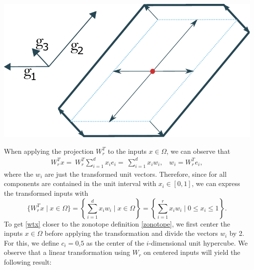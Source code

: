 \documentclass[
  a4paper,  %
  twoside,  %
  bibliography=totoc,
  headsepline,
  cleardoublepage=empty,
  parskip=half,
  draft=false
]{scrbook}
\begin{document}
\begin{mdframed}[style=style]
        \centering
\begin{minipage}{.4\textwidth}
        \centering
  \label{fig:zonotope}
    \end{minipage}%
    \begin{minipage}{0.6\textwidth}
        \centering
        \vspace{3.5mm}
  \includegraphics[width=0.8\linewidth]{graphics/zonotope}
  \hspace{-5.5mm}
    \end{minipage}
\end{mdframed}
%
When applying the projection $W_r^T$ to the inputs $x \in \Omega$, we can observe that
\begin{equation}
\begin{split}
W_r^T x=~W_r^T \sum_{i=1}^d x_i e_i=~\sum_{i=1}^d x_i w_i , ~~~~ w_i=W_r^T e_i,
\end{split}
\end{equation}
where the $w_i$ are just the transformed unit vectors.
Therefore, since for all components are contained in the unit interval with $x_i \in [0,1]$, we can express the transformed inputs with
\begin{equation}
\{W_r^T x \mid x \in \Omega\}=\left\{\sum_{i=1}^d x_i w_i \mid x \in \Omega \right\}=\left\{ \sum_{i=1}^r x_i w_i \mid 0 \leq x_i \leq 1\right\}.
\label{wtx}
\end{equation}
To get \cref{wtx} closer to the zonotope definition \cref{zonotope}, we first center the inputs $x \in \Omega$ before applying the transformation and divide the vectors $w_i$ by 2.
For this, we define $c_i=\underline{0.5}$ as the center of the $i$-dimensional unit hypercube.
We observe that a linear transformation using $W_r$ on centered inputs will yield the following result:
\end{document}
